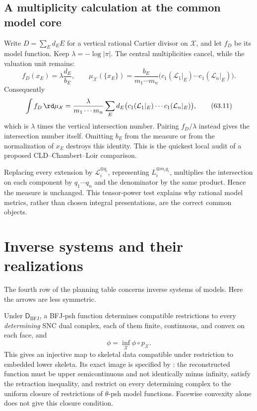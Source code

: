 \subsection{A multiplicity calculation at the common model core}
\label{subsec:dict-multiplicities}

Write $D=\sum_Ed_EE$ for a vertical rational Cartier divisor on
$\mathcal X$, and let $f_D$ be its model function. Keep
$\lambda=-\log|\pi|$. The central multiplicities cancel, while the
valuation unit remains:
\[
 f_D(x_E)=\lambda\frac{d_E}{b_E},
 \qquad
 \mu_{\mathcal X}(\{x_E\})
 =\frac{b_E}{m_1\cdots m_n}
   \bigl(c_1(\mathcal L_1|_E)\cdots
         c_1(\mathcal L_n|_E)\bigr).
\tag{63.10}\label{eq:dict-multiplicity-cancellation}
\]
Consequently
\[
 \int f_D\,\rd\mu_{\mathcal X}
 =\frac{\lambda}{m_1\cdots m_n}
   \sum_Ed_E
   \bigl(c_1(\mathcal L_1|_E)\cdots
         c_1(\mathcal L_n|_E)\bigr),
\tag{63.11}\label{eq:dict-model-duality-expanded}
\]
which is $\lambda$ times the vertical intersection number. Pairing
$f_D/\lambda$ instead gives the intersection number itself. Omitting $b_E$ from the
measure or from the normalization of $x_E$ destroys this identity.  This
is the quickest local audit of a proposed CLD--Chambert--Loir comparison.

Replacing every extension by
$\mathcal L_i^{\otimes q_i}$, representing
$L_i^{\otimes m_iq_i}$, multiplies the intersection on each component by
$q_1\cdots q_n$ and the denominator by the same product.  Hence the
measure is unchanged.  This tensor-power test explains why rational model
metrics, rather than chosen integral presentations, are the correct common
objects.

\section{Inverse systems and their realizations}
\label{sec:dict-inverse-systems}

The fourth row of the planning table concerns inverse systems of models.
Here the arrows are less symmetric.

\noindent\begin{minipage}{\linewidth}
\begin{proposition}\label{prop:dict-bfj-skeletal}
Under $\mathsf D_{\mathrm{BFJ}}$, a BFJ-psh function determines compatible
restrictions to every \emph{determining} SNC dual complex, each of them
finite, continuous, and convex on each face, and
\[
                  \phi=\inf_{\mathcal X}\phi\circ p_{\mathcal X}.
\tag{63.12}\label{eq:dict-bfj-inverse-system}
\]
This gives an injective map to skeletal data compatible under restriction
to embedded lower skeleta. Its exact image is specified by
: the reconstructed function must be upper
semicontinuous and not identically minus infinity, satisfy the retraction
inequality, and restrict on every determining complex to the uniform
closure of restrictions of $\theta$-psh model functions.
Facewise convexity alone does not give this closure condition.
\end{proposition}
\end{minipage}

